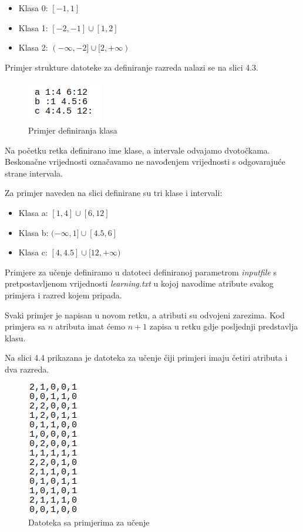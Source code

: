 \documentclass[times, utf8, zavrsni]{fer}
\begin{document}
\begin{itemize}
\item Klasa 0: $[-1,  1]$
\item Klasa 1: $[-2, -1] \cup [1, 2]$
\item Klasa 2: $(-\infty, -2] \cup [2, +\infty)$

\end{itemize}

Primjer strukture datoteke za definiranje razreda nalazi se na slici 4.3.

\begin{figure}[htb]
\centering
\includegraphics[scale=0.6]{images/klase}
\caption{Primjer definiranja klasa}
\end{figure}

Na početku retka definirano ime klase, a intervale odvajamo dvotočkama.
Beskonačne vrijednosti označavamo ne navođenjem vrijednosti s odgovarajuće strane intervala.

Za primjer naveden na slici definirane su tri klase i intervali:

\begin{itemize}
\item Klasa a: $[1,4] \cup [6,12]$
\item Klasa b: $(-\infty, 1] \cup [4.5,6]$
\item Klasa c: $[4, 4.5] \cup [12, +\infty)$
\end{itemize}


Primjere za učenje definiramo u datoteci definiranoj parametrom \textit{inputfile} s pretpostavljenom vrijednosti \textit{learning.txt} u kojoj navodime atribute svakog primjera i razred kojem pripada.

Svaki primjer je napisan u novom retku, a atributi su odvojeni zarezima. Kod primjera sa $n$ atributa imat ćemo $n+1$ zapisa u retku gdje posljednji predstavlja klasu.

Na slici 4.4 prikazana je datoteka za učenje čiji primjeri imaju četiri atributa i dva razreda.


\begin{figure}[htb]
\centering
\includegraphics[scale=0.6]{images/learning}
\caption{Datoteka sa primjerima za učenje}
\end{figure}
\end{document}
